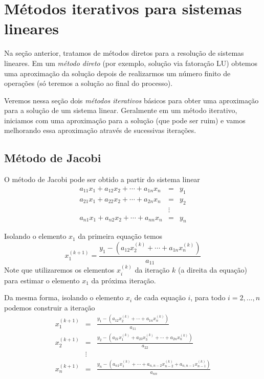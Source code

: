 \section{Métodos iterativos para sistemas lineares}
Na seção anterior, tratamos de métodos diretos para a resolução de sistemas lineares. Em um \emph{método direto} (por exemplo, solução via fatoração LU) obtemos uma aproximação da solução depois de realizarmos um número finito de operações (só teremos a solução ao final do processo).

Veremos nessa seção dois \emph{métodos iterativos} básicos para obter uma aproximação para a solução de um sistema linear. Geralmente em um método iterativo, iniciamos com uma aproximação para a solução (que pode ser ruim) e vamos melhorando essa aproximação através de sucessivas iterações.

\subsection{Método de Jacobi}
O método de Jacobi pode ser obtido a partir do sistema linear
\begin{eqnarray}
a_{11}x_1+a_{12}x_2+\cdots+a_{1n}x_n&=&y_1\\
a_{21}x_1+a_{22}x_2+\cdots+a_{2n}x_n&=&y_2\\
&\vdots&     \\
a_{n1}x_1+a_{n2}x_2+\cdots+a_{nn}x_n&=& y_n
\end{eqnarray}

Isolando o elemento $x_1$ da primeira equação temos
\begin{equation}
x_1^{(k+1)}= \frac{y_1 - \left(a_{12}x_2^{(k)}+\cdots+a_{1n}x_n^{(k)}\right)}{a_{11}}
\end{equation}
Note que utilizaremos os elementos $x_i^{(k)}$ da iteração $k$ (a direita da equação) para estimar o elemento $x_1$ da próxima iteração.

Da mesma forma, isolando o elemento $x_i$ de cada equação $i$, para todo $i=2,...,n$ podemos construir a iteração
\begin{eqnarray}
x_1^{(k+1)}&=&\frac{y_1 - \left(a_{12}x_2^{(k)}+\cdots+a_{1n}x_n^{(k)}\right)}{a_{11}}\\
x_2^{(k+1)}&=&\frac{y_2 - \left(a_{21}x_1^{(k)}+a_{23}x_3^{(k)}+\cdots+a_{2n}x_n^{(k)}\right)}{a_{22}}\\
&\vdots&\\
x_n^{(k+1)}&=&\frac{y_n - \left(a_{n1}x_1^{(k)}+\cdots+a_{n,n-2}x_{n-2}^{(k)}+a_{n,n-1}x_{n-1}^{(k)}\right)}{a_{nn}}
\end{eqnarray}

